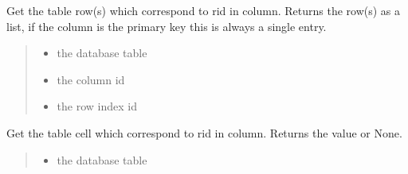 \documentclass[letterpaper,12pt,english]{sphinxmanual}
\begin{document}
\begin{fulllineitems}
\begin{fulllineitems}
\end{fulllineitems}


\begin{fulllineitems}
\label{\detokenize{api/networking:cbmpy.CBNetDB.DBTools.getRow}}
\pysigstartsignatures
\pysiglinewithargsret
{}
{\sphinxparamcomma {}\sphinxparamcomma {}}
{}
\pysigstopsignatures
\sphinxAtStartPar
Get the table row(s) which correspond to rid in column. Returns the row(s) as a list, if the column is the primary key this is always a single entry.
\begin{quote}\begin{description}
\begin{itemize}
\item {} 
\sphinxAtStartPar
{} \textendash{} the database table

\item {} 
\sphinxAtStartPar
{} \textendash{} the column id

\item {} 
\sphinxAtStartPar
{} \textendash{} the row index id

\end{itemize}

\end{description}\end{quote}

\end{fulllineitems}


\begin{fulllineitems}
\label{\detokenize{api/networking:cbmpy.CBNetDB.DBTools.getCell}}
\pysigstartsignatures
\pysiglinewithargsret
{}
{\sphinxparamcomma {}\sphinxparamcomma {}\sphinxparamcomma {}}
{}
\pysigstopsignatures
\sphinxAtStartPar
Get the table cell which correspond to rid in column. Returns the value or None.
\begin{quote}\begin{description}
\begin{itemize}
\item {} 
\sphinxAtStartPar
{} \textendash{} the database table


\end{itemize}
\end{description}
\end{quote}
\end{fulllineitems}
\end{fulllineitems}
\end{document}
